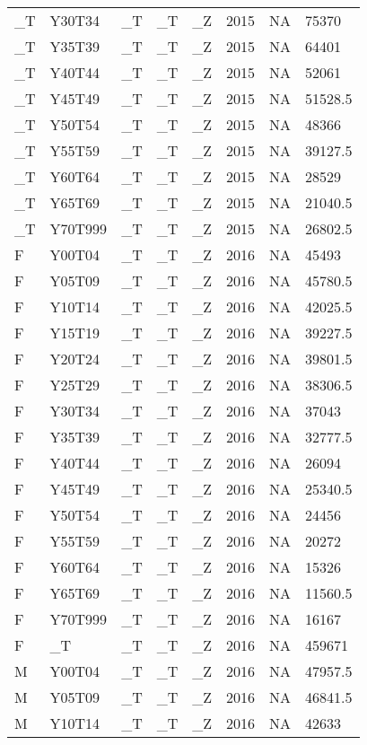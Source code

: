 \begin{longtable}[t]{llllllll}
\_T & Y30T34 & \_T & \_T & \_Z & 2015 & NA & 75370\\
\_T & Y35T39 & \_T & \_T & \_Z & 2015 & NA & 64401\\
\addlinespace
\_T & Y40T44 & \_T & \_T & \_Z & 2015 & NA & 52061\\
\_T & Y45T49 & \_T & \_T & \_Z & 2015 & NA & 51528.5\\
\_T & Y50T54 & \_T & \_T & \_Z & 2015 & NA & 48366\\
\_T & Y55T59 & \_T & \_T & \_Z & 2015 & NA & 39127.5\\
\_T & Y60T64 & \_T & \_T & \_Z & 2015 & NA & 28529\\
\addlinespace
\_T & Y65T69 & \_T & \_T & \_Z & 2015 & NA & 21040.5\\
\_T & Y70T999 & \_T & \_T & \_Z & 2015 & NA & 26802.5\\
F & Y00T04 & \_T & \_T & \_Z & 2016 & NA & 45493\\
F & Y05T09 & \_T & \_T & \_Z & 2016 & NA & 45780.5\\
F & Y10T14 & \_T & \_T & \_Z & 2016 & NA & 42025.5\\
\addlinespace
F & Y15T19 & \_T & \_T & \_Z & 2016 & NA & 39227.5\\
F & Y20T24 & \_T & \_T & \_Z & 2016 & NA & 39801.5\\
F & Y25T29 & \_T & \_T & \_Z & 2016 & NA & 38306.5\\
F & Y30T34 & \_T & \_T & \_Z & 2016 & NA & 37043\\
F & Y35T39 & \_T & \_T & \_Z & 2016 & NA & 32777.5\\
\addlinespace
F & Y40T44 & \_T & \_T & \_Z & 2016 & NA & 26094\\
F & Y45T49 & \_T & \_T & \_Z & 2016 & NA & 25340.5\\
F & Y50T54 & \_T & \_T & \_Z & 2016 & NA & 24456\\
F & Y55T59 & \_T & \_T & \_Z & 2016 & NA & 20272\\
F & Y60T64 & \_T & \_T & \_Z & 2016 & NA & 15326\\
\addlinespace
F & Y65T69 & \_T & \_T & \_Z & 2016 & NA & 11560.5\\
F & Y70T999 & \_T & \_T & \_Z & 2016 & NA & 16167\\
F & \_T & \_T & \_T & \_Z & 2016 & NA & 459671\\
M & Y00T04 & \_T & \_T & \_Z & 2016 & NA & 47957.5\\
M & Y05T09 & \_T & \_T & \_Z & 2016 & NA & 46841.5\\
\addlinespace
M & Y10T14 & \_T & \_T & \_Z & 2016 & NA & 42633\\

\end{longtable}
